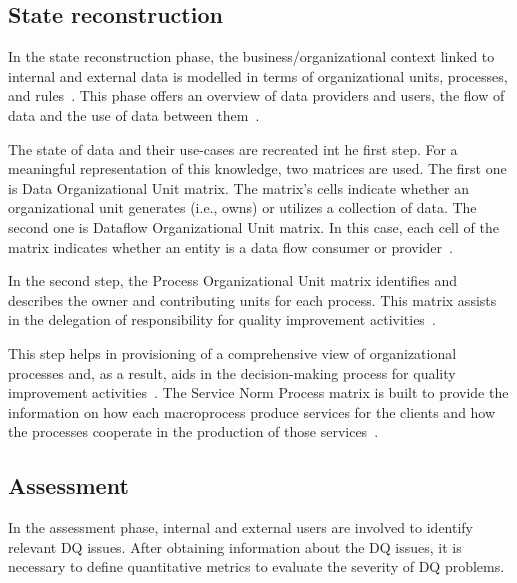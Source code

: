 \subsection{State reconstruction}

In the state reconstruction phase, the business/organizational context linked to internal and external data is modelled in terms of organizational units, processes, and rules~\cite{batini2008}.
This phase offers an overview of data providers and users, the flow of data and the use of data between them~\cite{batini2008}.

The state of data and their use-cases are recreated int he first step.
For a meaningful representation of this knowledge, two matrices are used.
The first one is Data Organizational Unit matrix.
The matrix's cells indicate whether an organizational unit generates (i.e., owns) or utilizes a collection of data.
The second one is Dataflow Organizational Unit matrix.
In this case, each cell of the matrix indicates whether an entity is a data flow consumer or provider~\cite{batini2008}.

In the second step, the Process Organizational Unit matrix identifies and describes the owner and contributing units for each process.
This matrix assists in the delegation of responsibility for quality improvement activities~\cite{batini2008}.

This step helps in provisioning of a comprehensive view of organizational processes and, as a result, aids in the decision-making process for quality improvement activities~\cite{batini2008}.
The Service Norm Process matrix is built to provide the information on how each macroprocess produce services for the clients and how the processes cooperate in the production of those services~\cite{batini2008}.

\subsection{Assessment}

In the assessment phase, internal and external users are involved to identify relevant DQ issues.
After obtaining information about the DQ issues, it is necessary to define quantitative metrics to evaluate the severity of DQ problems.

